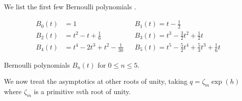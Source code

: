 We list the first few Bernoulli polynomials \cite{BernoulliPolynomial}. 
\begin{table}[h]\label{table: Bernoulli polynomials}
    \begin{align*}
        B_{0}(t)&=1 && B_{1}(t)=t-\frac{1}{2} \\
        B_{2}(t)&=t^{2}-t+\frac{1}{6} && B_{3}(t)=t^{3}-\frac{3}{2}t^{2}+\frac{1}{2}t\\
        B_{4}(t)&=t^{4}-2t^{3}+t^{2}-\frac{1}{30} && B_{5}(t)=t^{5}-\frac{5}{2}t^{4}+\frac{5}{3}t^{3}+\frac{1}{6}t
    \end{align*}
    \caption{Bernoulli polynomials $B_{n}(t)$ for $0\leq n\leq 5$.}
\end{table}

We now treat the asymptotics at other roots of unity, taking $q=\zeta_{m}\exp(h)$ where $\zeta_{m}$ is a primitive $m$th root of unity. 

